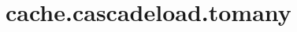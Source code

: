 \section{cache.cascadeload.tomany}
\label{configuration:CacheCascadeloadTomany}
\AvailableInCsharpOnly{\TODO}